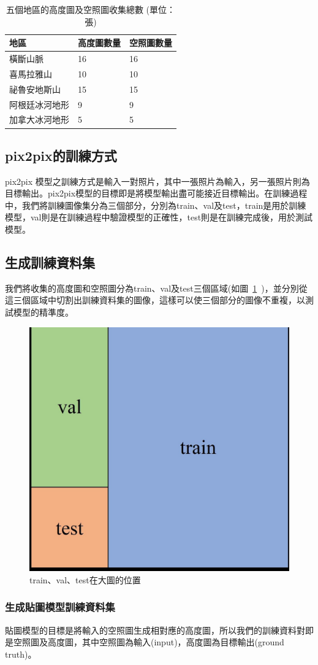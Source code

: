 \documentclass[a4paper, 12pt]{article}
\begin{document}
\begin{table}[htbp]
\centering
\caption{五個地區的高度圖及空照圖收集總數 (單位：張)}
\begin{tabularx}{\linewidth}{|Y|Y|Y|}
\hline
地區      & 高度圖數量 & 空照圖數量 \\ \hline
橫斷山脈    & 16    & 16    \\ \hline
喜馬拉雅山   & 10    & 10    \\ \hline
祕魯安地斯山  & 15    & 15    \\ \hline
阿根廷冰河地形 & 9     & 9     \\ \hline
加拿大冰河地形 & 5     & 5     \\ \hline
\end{tabularx}
\label{tab:2}
\end{table}
\subsection{pix2pix的訓練方式}
pix2pix 模型之訓練方式是輸入一對照片，其中一張照片為輸入，另一張照片則為目標輸出。pix2pix模型的目標即是將模型輸出盡可能接近目標輸出。在訓練過程中，我們將訓練圖像集分為三個部分，分別為train、val及test，train是用於訓練模型，val則是在訓練過程中驗證模型的正確性，test則是在訓練完成後，用於測試模型。
\subsection{生成訓練資料集}
我們將收集的高度圖和空照圖分為train、val及test三個區域(如圖~\ref{fig:8}~)，並分別從這三個區域中切割出訓練資料集的圖像，這樣可以使三個部分的圖像不重複，以測試模型的精準度。

\begin{figure}[htbp]
    \centering
    \includegraphics[width=0.3\linewidth]{fig/8.jpg}
    \caption{train、val、test在大圖的位置}
    \label{fig:8}
\end{figure}

\subsubsection{生成貼圖模型訓練資料集}
貼圖模型的目標是將輸入的空照圖生成相對應的高度圖，所以我們的訓練資料對即是空照圖及高度圖，其中空照圖為輸入(input)，高度圖為目標輸出(ground truth)。
\end{document}
